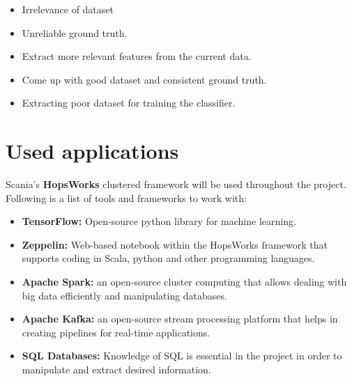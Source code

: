 \documentclass[paper=a4, fontsize=10pt,margin=0.2in]{scrartcl}
\newenvironment{myitemize}{%
    \begin{itemize}[leftmargin=0pt] \footnotesize }%
    {\end{itemize}}
\numberwithin{equation}{section}		%
\numberwithin{figure}{section}			%
\numberwithin{table}{section}				%
\begin{document}
\begin{tcbraster}[raster columns=3, raster equal height, raster column skip=0mm, raster row skip=0mm, 
]
\begin{tcolorbox}[mybox={}{WO}]
\begin{myitemize}
\end{myitemize}
\end{tcolorbox}
\begin{tcolorbox}[mybox={T}{harmful!50!external}]
\begin{myitemize}
\item Irrelevance of dataset
\item Unreliable ground truth.
\end{myitemize}
\end{tcolorbox}
\begin{tcolorbox}[mybox={}{ST}]
\begin{myitemize}
\item Extract more relevant features from the current data.
\item Come up with good dataset and consistent ground truth.
\end{myitemize}
\end{tcolorbox}
\begin{tcolorbox}[mybox={}{WT}]
\begin{myitemize}
\item Extracting poor dataset for training the classifier.

\end{myitemize}
\end{tcolorbox}

\end{tcbraster}
  \addvspace{2cm}

\section{Used applications} %
Scania's \textbf{HopsWorks} clustered framework will be used throughout the project. Following is a list of tools and frameworks to work with:
\begin{itemize}
\item \textbf{TensorFlow:} Open-source python library for machine learning.
\item \textbf{Zeppelin:} Web-based notebook within the HopsWorks framework that supports coding in Scala, python and other programming languages.
\item \textbf{Apache Spark:} an open-source cluster computing that allows dealing with big data efficiently and manipulating databases.
\item \textbf{Apache Kafka:}  an open-source stream processing platform that helps in creating pipelines for real-time applications.
\item \textbf{SQL Databases:}  Knowledge of SQL is essential in the project in order to manipulate and extract desired information.

\end{itemize}
\end{document}
